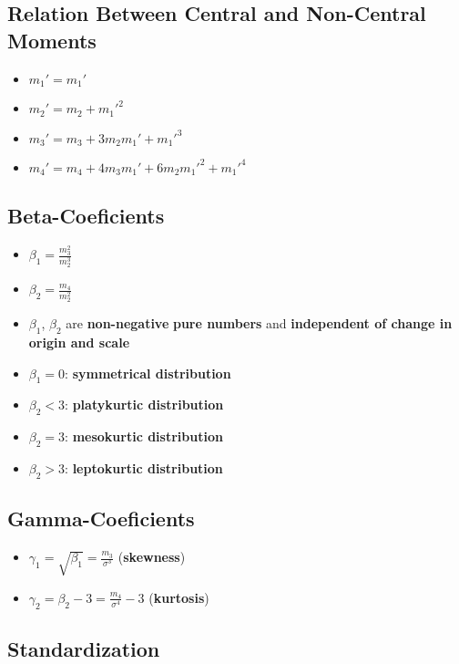 \subsection*{Relation Between Central and Non-Central Moments}
\begin{itemize}
    \item $m_1' = m_1'$
    \item $m_2' = m_2 + m_1'^2$
    \item $m_3' = m_3 + 3m_2 m_1' + m_1'^3$
    \item $m_4' = m_4 + 4m_3 m_1' + 6m_2 m_1'^2 + m_1'^4$
\end{itemize}

\subsection*{Beta-Coeficients}
\begin{itemize}
    \item $\beta_1 = \frac{m_3^2}{m_2^3}$
    \item $\beta_2 = \frac{m_4}{m_2^2}$
    \item $\beta_1$, $\beta_2$ are \textbf{non-negative} \textbf{pure numbers} and \textbf{independent of change in origin and scale}
    \item $\beta_1 = 0$: \textbf{symmetrical distribution}
    \item $\beta_2 < 3$: \textbf{platykurtic distribution}
    \item $\beta_2 = 3$: \textbf{mesokurtic distribution}
    \item $\beta_2 > 3$: \textbf{leptokurtic distribution}
\end{itemize}

\subsection*{Gamma-Coeficients}
\begin{itemize}
    \item $\gamma_1 = \sqrt{\beta_1} = \frac{m_3}{\sigma^3}$ (\textbf{skewness})
    \item $\gamma_2 = \beta_2 - 3 = \frac{m_4}{\sigma^4} - 3$ (\textbf{kurtosis})
\end{itemize}

\subsection*{Standardization}

